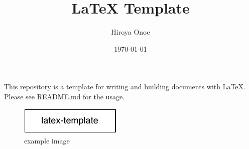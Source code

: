 \documentclass[a4paper,11pt,uplatex,dvipdfmx]{article}
\begin{document}
\title{LaTeX Template}
\author{Hiroya Onoe}
\date{\today}
\maketitle

This repository is a template for writing and building documents with LaTeX. Please see README.md\cite{latex-template} for the usage.

\begin{figure}[htb]
	\centering
	\includegraphics[keepaspectratio, width=\hsize]{images/example.pdf}
	\caption{example image}
	\label{fig: example}
\end{figure}



\end{document}

